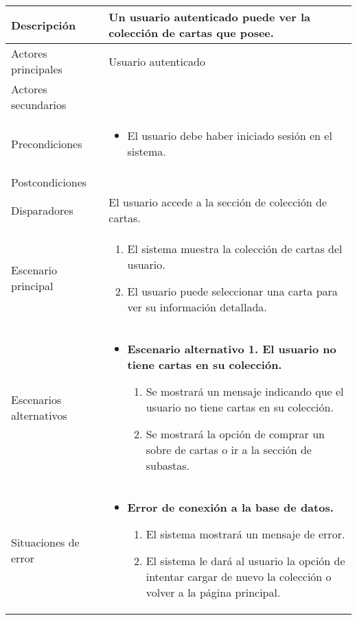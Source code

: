 \begin{longtable}{
    >{\columncolor{lightgreen!20}}p{4cm}
    p{12cm}
    }
    \midrule
    Descripción & Un usuario autenticado puede ver la colección de cartas que posee. \\
    \midrule
    Actores principales & Usuario autenticado \\
    \midrule
    Actores secundarios &  \\
    \midrule
    Precondiciones & \begin{itemize}[nosep,leftmargin=*]
        \item El usuario debe haber iniciado sesión en el sistema.
    \end{itemize} \\
    \midrule
    Postcondiciones & \\
    \midrule
    Disparadores & El usuario accede a la sección de colección de cartas. \\
    \midrule
    Escenario principal & \begin{enumerate}[nosep,leftmargin=*]
        \item El sistema muestra la colección de cartas del usuario.
        \item El usuario puede seleccionar una carta para ver su información detallada.
    \end{enumerate} \\
    \midrule
    Escenarios alternativos & 
    \begin{itemize}[nosep,leftmargin=*]
        \item \textbf{Escenario alternativo 1. El usuario no tiene cartas en su colección.}
        \begin{enumerate}[nosep,leftmargin=*]
            \item Se mostrará un mensaje indicando que el usuario no tiene cartas en su colección.
            \item Se mostrará la opción de comprar un sobre de cartas o ir a la sección de subastas.
        \end{enumerate}
    \end{itemize} \\
    \midrule
    Situaciones de error & 
    \begin{itemize}[nosep,leftmargin=*]
        \item \textbf{Error de conexión a la base de datos.}
        \begin{enumerate}[nosep,leftmargin=*]
            \item El sistema mostrará un mensaje de error.
            \item El sistema le dará al usuario la opción de intentar cargar de nuevo la colección o volver a la página principal.
        \end{enumerate}
    \end{itemize} \\
\end{longtable}


